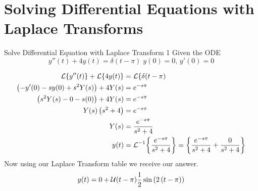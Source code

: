 \section{Solving Differential Equations with Laplace Transforms}\label{sec:Solve_Diff_Eqns_Laplace}
\begin{example}[]{Solve Differential Equation with Laplace Transform 1}
  Given the ODE
  \begin{equation*}
    y''(t) + 4y(t) = \delta(t-\pi) \; y(0) = 0, \, y'(0) = 0
  \end{equation*}

  \tcblower

  \begin{align*}
    \operatorname{\mathcal{L}} \lbrace y''(t) \rbrace + \operatorname{\mathcal{L}} \lbrace 4 y(t) \rbrace &= \operatorname{\mathcal{L}} \lbrace \delta (t - \pi) \\
    \left(  -y'(0) - sy(0) + s^{2}Y(s) \right) + 4Y(s) &= e^{-s \pi} \\
    \left( s^{2}Y(s) - 0 - s(0) \right) + 4Y(s) &= e^{-s \pi} \\
    Y(s) \left( s^{2} + 4 \right) &= e^{-s \pi} \\
    Y(s) &= \frac{e^{-s \pi}}{s^{2}+4} \\
    y(t) &= \operatorname{\mathcal{L}}^{-1} \biggl\lbrace \frac{e^{-s \pi}}{s^{2}+4} \biggr\rbrace = \biggl\lbrace \frac{e^{-s \pi}}{s^{2}+4} + \frac{0}{s^{2}+4} \biggr\rbrace
  \end{align*}
  Now using our Laplace Transform table we receive our answer.
  \begin{equation*}
    y(t) = 0 + \operatorname{\mathcal{U}}(t - \pi) \frac{1}{2}\sin \left( 2 \left( t - \pi \right) \right)
  \end{equation*}
\end{example}

